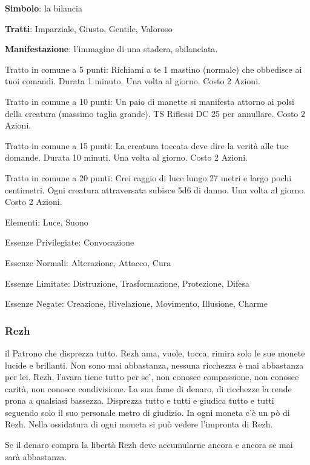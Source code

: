 \documentclass[a4paper,11pt,twoside,openany]{book}
\begin{document}
\textbf{Simbolo}: la bilancia

\textbf{Tratti}: Imparziale, Giusto, Gentile, Valoroso

\textbf{Manifestazione}: l'immagine di una stadera, sbilanciata.

\bigskip

Tratto in comune a 5 punti: Richiami a te 1 mastino (normale) che obbedisce ai tuoi comandi. Durata 1 minuto. Una volta al giorno. Costo 2 Azioni.

Tratto in comune a 10 punti: Un paio di manette si manifesta attorno ai polsi della creatura (massimo taglia grande). TS Riflessi DC 25 per annullare. Costo 2 Azioni.

Tratto in comune a 15 punti: La creatura toccata deve dire la verità alle tue domande. Durata 10 minuti. Una volta al giorno. Costo 2 Azioni.

Tratto in comune a 20 punti: Crei raggio di luce lungo 27 metri e largo pochi centimetri. Ogni creatura attraversata subisce 5d6 di danno. Una volta al giorno. Costo 2 Azioni.

\bigskip

Elementi: Luce, Suono

\bigskip

Essenze Privilegiate: Convocazione

Essenze Normali: Alterazione, Attacco, Cura

Essenze Limitate: Distruzione, Trasformazione, Protezione, Difesa

Essenze Negate: Creazione, Rivelazione, Movimento, Illusione, Charme

\subsubsection{Rezh}

\label{rezh}

il Patrono che disprezza tutto. Rezh ama, vuole, tocca, rimira solo le sue monete lucide e brillanti. Non sono mai abbastanza, nessuna ricchezza è mai abbastanza per lei. Rezh, l'avara tiene tutto per se', non conosce compassione, non conosce carità, non conosce condivisione. La sua fame di denaro, di ricchezze la rende prona a qualsiasi bassezza. Disprezza tutto e tutti e giudica tutto e tutti seguendo solo il suo personale metro di giudizio. In ogni moneta c'è un pò di Rezh. Nella ossidatura di ogni moneta si può vedere l'impronta di Rezh.

Se il denaro compra la libertà Rezh deve accumularne ancora e ancora se mai sarà abbastanza.
\end{document}
